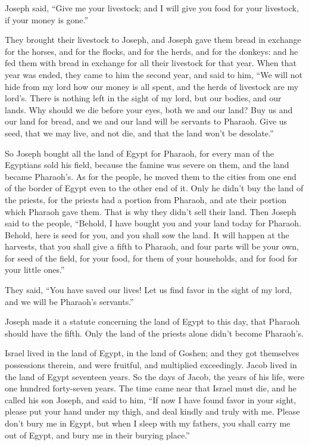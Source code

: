 \myverse{}Joseph said, “Give me your livestock; and I will give you food for your livestock, if your money is gone.”

\myverse{}They brought their livestock to Joseph, and Joseph gave them bread in exchange for the horses, and for the flocks, and for the herds, and for the donkeys: and he fed them with bread in exchange for all their livestock for that year.  \myverse{}When that year was ended, they came to him the second year, and said to him, “We will not hide from my lord how our money is all spent, and the herds of livestock are my lord’s. There is nothing left in the sight of my lord, but our bodies, and our lands.  \myverse{}Why should we die before your eyes, both we and our land? Buy us and our land for bread, and we and our land will be servants to Pharaoh. Give us seed, that we may live, and not die, and that the land won’t be desolate.”

\myverse{}So Joseph bought all the land of Egypt for Pharaoh, for every man of the Egyptians sold his field, because the famine was severe on them, and the land became Pharaoh’s.  \myverse{}As for the people, he moved them to the cities from one end of the border of Egypt even to the other end of it.  \myverse{}Only he didn’t buy the land of the priests, for the priests had a portion from Pharaoh, and ate their portion which Pharaoh gave them. That is why they didn’t sell their land.  \myverse{}Then Joseph said to the people, “Behold, I have bought you and your land today for Pharaoh. Behold, here is seed for you, and you shall sow the land.  \myverse{}It will happen at the harvests, that you shall give a fifth to Pharaoh, and four parts will be your own, for seed of the field, for your food, for them of your households, and for food for your little ones.”

\myverse{}They said, “You have saved our lives! Let us find favor in the sight of my lord, and we will be Pharaoh’s servants.”

\myverse{}Joseph made it a statute concerning the land of Egypt to this day, that Pharaoh should have the fifth. Only the land of the priests alone didn’t become Pharaoh’s.

\myverse{}Israel lived in the land of Egypt, in the land of Goshen; and they got themselves possessions therein, and were fruitful, and multiplied exceedingly.  \myverse{}Jacob lived in the land of Egypt seventeen years. So the days of Jacob, the years of his life, were one hundred forty-seven years.  \myverse{}The time came near that Israel must die, and he called his son Joseph, and said to him, “If now I have found favor in your sight, please put your hand under my thigh, and deal kindly and truly with me. Please don’t bury me in Egypt,  \myverse{}but when I sleep with my fathers, you shall carry me out of Egypt, and bury me in their burying place.”

